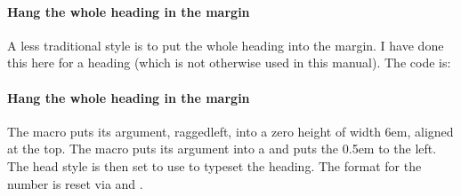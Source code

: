 



\newcommand{\marginbox}[1]{%
  \parbox[t][0pt]{6em}{\itshape\raggedleft\leavevmode #1}}
\newcommand{\marginhead}[1]{%
  {\llap{\marginbox{#1}\kern0.5em}}}
\setparaindent{0em}
\setafterparaskip{0em}
\setparaheadstyle{\marginhead}
\paragraph{Hang the whole heading in the margin}%
A less traditional style is to put the whole heading into the margin.
I have done this here for a \cmd{\paragraph} heading (which is not otherwise
used in this manual). The code is:
\begin{lcode}
\newcommand{\marginbox}[1]{%
  \parbox[t][0pt]{6em}{\itshape\raggedleft\leavevmode #1}}
\newcommand{\marginhead}[1]{%
  {\llap{\marginbox{#1}\kern0.5em}}}
\setparaindent{0em}
\setafterparaskip{0em}
\setparaheadstyle{\marginhead}
\paragraph{Hang the whole heading in the margin}%
\end{lcode}
The macro \cmd{\marginbox} puts its argument, raggedleft, into a zero height
\cmd{\parbox} of width 6em, aligned at the top. 
The \cmd{\marginhead} macro puts its argument into a 
\cmd{\marginbox} and puts the \cmd{\marginbox} 0.5em to the left. 
The \cmd{\paragraph} head style is then set to use \cmd{\marginhead} to 
typeset the heading. The format for the number is reset via 
\cmd{\setparahook} and \cmd{\setsecnumformat}.


